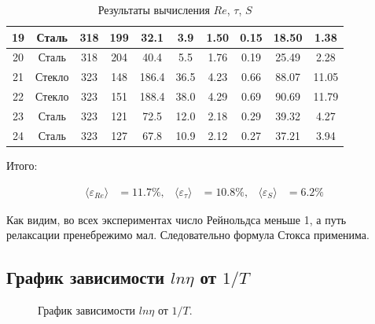 \documentclass[a4paper, 12pt]{article}
\begin{document}
\begin{table}[!ht]
\begin{tabular}{|c|c|c|c|c|c|c|c|c|c|}
            19 & Сталь & 318 & 199 & 32.1 & 3.9 & 1.50 & 0.15 & 18.50 & 1.38 \\ \hline
            20 & Сталь & 318 & 204 & 40.4 & 5.5 & 1.76 & 0.19 & 25.49 & 2.28 \\ \hline
            21 & Стекло & 323 & 148 & 186.4 & 36.5 & 4.23 & 0.66 & 88.07 & 11.05 \\ \hline
            22 & Стекло & 323 & 151 & 188.4 & 38.0 & 4.29 & 0.69 & 90.69 & 11.79 \\ \hline
            23 & Сталь & 323 & 121 & 72.5 & 12.0 & 2.18 & 0.29 & 39.32 & 4.27 \\ \hline
            24 & Сталь & 323 & 127 & 67.8 & 10.9 & 2.12 & 0.27 & 37.21 & 3.94 \\ \hline
        \end{tabular}
        \caption{Результаты вычисления $Re$, $\tau$, $S$}
        \label{re_tau_s}
    \end{table}

    Итого:

    \begin{align*}
        \langle \varepsilon_{Re} \rangle &= 11.7\%, & \langle \varepsilon_{\tau} \rangle &= 10.8\%, & \langle \varepsilon_S \rangle &= 6.2\%
    \end{align*}

    Как видим, во всех экспериментах число Рейнольдса меньше 1, а путь релаксации пренебрежимо мал. Следовательно формула Стокса применима.

    \subsection{График зависимости $ln \eta$ от $1/T$}

    \begin{figure}[ht]
        \caption{График зависимости $ln \eta$ от $1/T$.}
        \label{graph}
    \end{figure}
\end{document}
